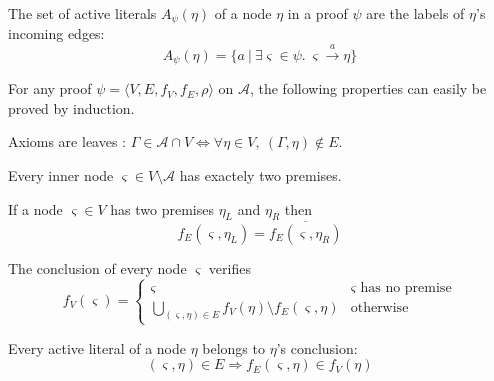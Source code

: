 \documentclass{llncs}
\begin{document}
\begin{definition}
The set of active literals $A_{\psi}(\eta)$ of a node $\eta$ in a proof $\psi$
are the labels of $\eta$'s incoming edges: 
$$
A_{\psi}(\eta) = \{a \ | \ \exists \varsigma \in \psi. \ \varsigma \xrightarrow{a} \eta \}
$$
\end{definition}

For any proof $\psi = \langle V,E,f_V,f_E,\rho \rangle$ on $\mathcal{A}$, the following properties
can easily be proved by induction.

\begin{property}
\label{prop:proof_leaf}
Axioms are leaves : $\Gamma \in \mathcal{A} \cap V \Leftrightarrow \forall \eta \in V ,~
(\Gamma,\eta) \notin E$.
\end{property}

\begin{property}
Every inner node $\varsigma \in V \setminus \mathcal{A}$ has exactely two premises.
\end{property}

\begin{property}
\label{prop:proof_edges}
If a node $\varsigma \in V$ has two premises $\eta_L$ and $\eta_R$ then
\begin{equation*}
f_E(\varsigma,\eta_L) = \overline{f_E(\varsigma,\eta_R)}
\end{equation*}
\end{property}

\begin{property}
\label{prop:proof_conclusion}
The conclusion of every node $\varsigma$ verifies
\begin{equation*}
  f_V(\varsigma) = \begin{cases}
    \varsigma & \varsigma \text{ has no premise} \\
    \bigcup_{(\varsigma,\eta) \in E}{f_V(\eta) \setminus f_E(\varsigma,\eta)} & \text{otherwise}
  \end{cases}
\end{equation*}
\end{property}

\begin{property}
Every active literal of a node $\eta$ belongs to $\eta$'s conclusion:
\begin{equation*}
  (\varsigma,\eta) \in E \Rightarrow f_E(\varsigma,\eta) \in f_V(\eta)
\end{equation*}
\end{property}
\end{document}
